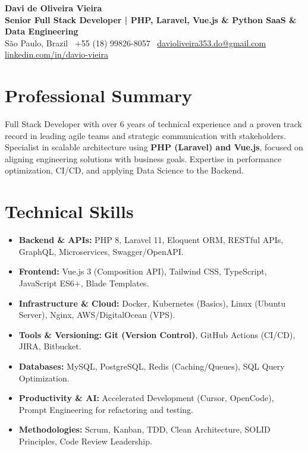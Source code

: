 \documentclass[a4paper,10pt]{article}
\begin{document}
\begin{center}
    {\Huge \textbf{Davi de Oliveira Vieira}} \\ [4pt]
    {\Large \textbf{Senior Full Stack Developer | PHP, Laravel, Vue.js \& Python \textbar{} SaaS \& Data Engineering}} \\ [4pt]
    São Paulo, Brazil \textbullet\ +55 (18) 99826-8057 \textbullet\ \href{mailto:davioliveira353.do@gmail.com}{davioliveira353.do@gmail.com} \\
    \href{https://www.linkedin.com/in/davio-vieira}{linkedin.com/in/davio-vieira}
\end{center}

\section{Professional Summary}
Full Stack Developer with over 6 years of technical experience and a proven track record in leading agile teams and strategic communication with stakeholders. Specialist in scalable architecture using \textbf{PHP (Laravel) and Vue.js}, focused on aligning engineering solutions with business goals. Expertise in performance optimization, CI/CD, and applying Data Science to the Backend.

\section{Technical Skills}
\begin{itemize}[noitemsep, leftmargin=*]
    \item \textbf{Backend \& APIs:} PHP 8, Laravel 11, Eloquent ORM, RESTful APIs, GraphQL, Microservices, Swagger/OpenAPI.
    \item \textbf{Frontend:} Vue.js 3 (Composition API), Tailwind CSS, TypeScript, JavaScript ES6+, Blade Templates.
    \item \textbf{Infrastructure \& Cloud:} Docker, Kubernetes (Basics), Linux (Ubuntu Server), Nginx, AWS/DigitalOcean (VPS).
    \item \textbf{Tools \& Versioning:} \textbf{Git (Version Control)}, GitHub Actions (CI/CD), JIRA, Bitbucket.
    \item \textbf{Databases:} MySQL, PostgreSQL, Redis (Caching/Queues), SQL Query Optimization.
    \item \textbf{Productivity \& AI:} Accelerated Development (Cursor, OpenCode), Prompt Engineering for refactoring and testing.
    \item \textbf{Methodologies:} Scrum, Kanban, TDD, Clean Architecture, SOLID Principles, Code Review Leadership.
\end{itemize}
\end{document}
